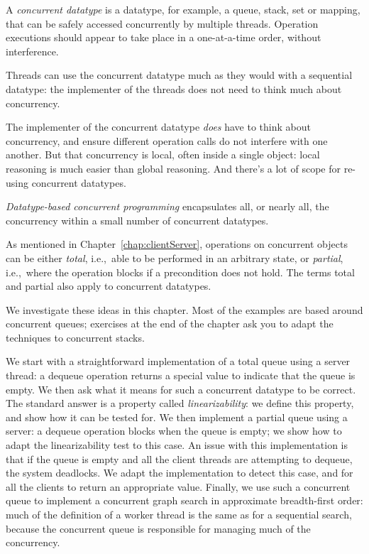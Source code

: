 A \emph{concurrent datatype} is a datatype, for
example, a queue, stack, set or mapping, that can be safely accessed
concurrently by multiple threads.  Operation executions should appear to take
place in a one-at-a-time order, without interference.

Threads can use the concurrent datatype much as they would with a sequential
datatype: the implementer of the threads does not need to think much about
concurrency.

The implementer of the concurrent datatype \emph{does} have to think about
concurrency, and ensure different operation calls do not interfere with one
another.  But that concurrency is local, often inside a single object: local
reasoning is much easier than global reasoning.  And there's a lot of scope
for re-using concurrent datatypes.

\emph{Datatype-based concurrent programming}  encapsulates all, or nearly all, the
concurrency within a small number of concurrent datatypes.

As mentioned in Chapter~\ref{chap:clientServer}, operations on concurrent
objects can be either \emph{total}, i.e.,~able to be performed in an arbitrary
state, or \emph{partial}, i.e.,~where the operation blocks if a precondition
does not hold.  The terms total and partial also apply to concurrent
datatypes.

We investigate these ideas in this chapter.  Most of the examples are based
around concurrent queues; exercises at the end of the chapter ask you to adapt
the techniques to concurrent stacks.

We start with a straightforward implementation of a total queue using a server
thread: a dequeue operation returns a special value to indicate that the queue
is empty.  We then ask what it means for such a concurrent datatype to be
correct.  The standard answer is a property called \emph{linearizability}: we
define this property, and show how it can be tested for.  We then implement a
partial queue using a server: a dequeue operation blocks when the queue is
empty; we show how to adapt the linearizability test to this case.  An issue
with this implementation is that if the queue is empty and all the client
threads are attempting to dequeue, the system deadlocks.  We adapt the
implementation to detect this case, and for all the clients to return an
appropriate value.  Finally, we use such a concurrent queue to implement a
concurrent graph search in approximate breadth-first order: much of the
definition of a worker thread is the same as for a sequential search, because
the concurrent queue is responsible for managing much of the concurrency.

